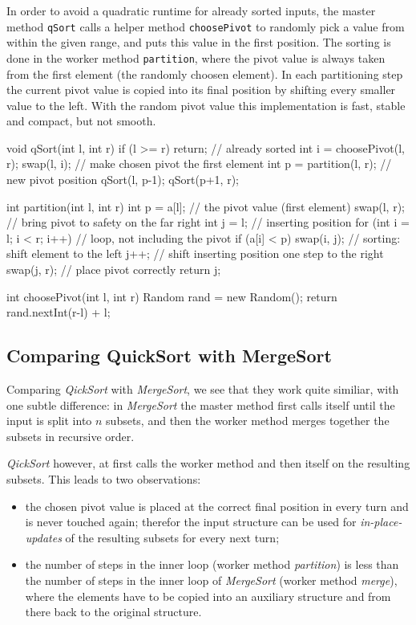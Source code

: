 \begin{impl}
In order to avoid a quadratic runtime for already sorted inputs, the master method \texttt{qSort} calls a helper method \texttt{choosePivot} to randomly pick a value from within the given range, and puts this value in the first position.
The sorting is done in the worker method \texttt{partition}, where the pivot value is always taken from the first element (the randomly choosen element).
In each partitioning step the current pivot value is copied into its final position by shifting every smaller value to the left. With the random pivot value this implementation is fast, stable and compact, but not smooth.
\end{impl}

\begin{javacode}
void qSort(int l, int r) {
    if (l >= r) return; // already sorted
    int i = choosePivot(l, r);
    swap(l, i); // make chosen pivot the first element
    int p = partition(l, r); // new pivot position
    qSort(l, p-1);
    qSort(p+1, r);
}

int partition(int l, int r) {
    int p = a[l]; // the pivot value (first element)
    swap(l, r); // bring pivot to safety on the far right
    int j = l; // inserting position
    for (int i = l; i < r; i++) { // loop, not including the pivot
        if (a[i] < p) {
            swap(i, j); // sorting: shift element to the left
            j++; // shift inserting position one step to the right
        }
    }
    swap(j, r); // place pivot correctly
    return j;
}

int choosePivot(int l, int r) {
    Random rand = new Random();
    return rand.nextInt(r-l) + l;
}
\end{javacode}

\subsection{Comparing QuickSort with MergeSort}
Comparing \emph{QickSort} with \emph{MergeSort}, we see that they work quite similiar, with one subtle difference:
in \emph{MergeSort} the master method first calls itself until the input is split into $n$ subsets, and then the worker method merges together the subsets in recursive order.

\emph{QickSort} however, at first calls the worker method and then itself on the resulting subsets.
This leads to two observations:
\begin{itemize}
    \item the chosen pivot value is placed at the correct final position in every turn and is never touched again; therefor the input structure can be used for \emph{in-place-updates} of the resulting subsets for every next turn;
    \item the number of steps in the inner loop (worker method \emph{partition}) is less than the number of steps in the inner loop of \emph{MergeSort} (worker method \emph{merge}), where the elements have to be copied into an auxiliary structure and from there back to the original structure.
\end{itemize}

